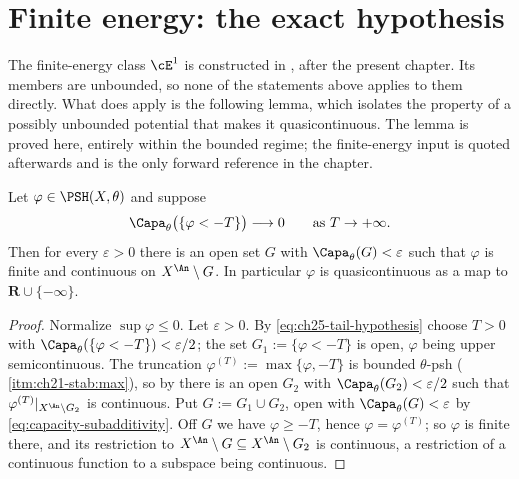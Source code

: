 \section{Finite energy: the exact hypothesis}
\label{sec:ch25-e1}

The finite-energy class \(\cE^1\) is constructed in
, after the present chapter.  Its members are
unbounded, so none of the statements above applies to them directly.  What
does apply is the following lemma, which isolates the property of a possibly
unbounded potential that makes it quasicontinuous.  The lemma is proved
here, entirely within the bounded regime; the finite-energy input is quoted
afterwards and is the only forward reference in the chapter.

\begin{lemma}
\label{lem:ch25-quasicontinuity-from-tail}
Let \(\varphi\in\PSH(X,\theta)\) and suppose
\begin{equation}
\label{eq:ch25-tail-hypothesis}
 \Capa_\theta\bigl(\{\varphi<-T\}\bigr)\longrightarrow0
 \qquad\text{as }T\to+\infty .
\end{equation}
Then for every \(\varepsilon>0\) there is an open set \(G\) with
\(\Capa_\theta(G)<\varepsilon\) such that \(\varphi\) is finite and
continuous on \(X^{\An}\setminus G\).  In particular \(\varphi\) is
quasicontinuous as a map to \(\mathbf R\cup\{-\infty\}\).
\end{lemma}

\begin{proof}
Normalize \(\sup\varphi\leq0\).  Let \(\varepsilon>0\).  By
\eqref{eq:ch25-tail-hypothesis} choose \(T>0\) with
\(\Capa_\theta(\{\varphi<-T\})<\varepsilon/2\); the set
\(G_1:=\{\varphi<-T\}\) is open, \(\varphi\) being upper semicontinuous.  The
truncation \(\varphi^{(T)}:=\max\{\varphi,-T\}\) is bounded \(\theta\)-psh
(\,\cref{itm:ch21-stab:max}), so by
 there is an open \(G_2\) with
\(\Capa_\theta(G_2)<\varepsilon/2\) such that
\(\varphi^{(T)}|_{X^{\An}\setminus G_2}\) is continuous.  Put
\(G:=G_1\cup G_2\), open with \(\Capa_\theta(G)<\varepsilon\) by
\eqref{eq:capacity-subadditivity}.  Off \(G\) we have \(\varphi\geq-T\),
hence \(\varphi=\varphi^{(T)}\); so \(\varphi\) is finite there, and its
restriction to \(X^{\An}\setminus G\subseteq X^{\An}\setminus G_2\) is
continuous, a restriction of a continuous function to a subspace being
continuous.
\end{proof}

